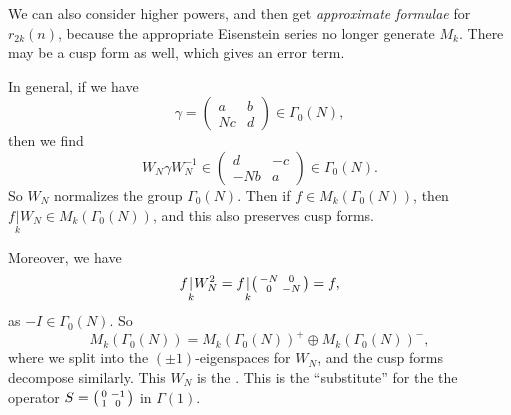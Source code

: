 \documentclass[a4paper]{article}
\begin{document}
We can also consider higher powers, and then get \emph{approximate formulae} for $r_{2k}(n)$, because the appropriate Eisenstein series no longer generate $M_k$. There may be a cusp form as well, which gives an error term.

In general, if we have
\[
  \gamma =
  \begin{pmatrix}
    a & b\\
    Nc & d
  \end{pmatrix} \in \Gamma_0(N),
\]
then we find
\[
  W_N \gamma W_N^{-1} \in
  \begin{pmatrix}
    d & -c\\
    -Nb & a
  \end{pmatrix} \in \Gamma_0(N).
\]
So $W_N$ normalizes the group $\Gamma_0(N)$. Then if $f \in M_k(\Gamma_0(N))$, then $f \underset{k}{|} W_N \in M_k(\Gamma_0(N))$, and this also preserves cusp forms.

Moreover, we have
\[
  f \underset{k}{|} W_N^2 = f \underset{k}{|}
  \begin{psmallmatrix}
    -N & 0\\
    0 & -N
  \end{psmallmatrix} = f,
\]
as $-I \in \Gamma_0(N)$. So
\[
  M_k(\Gamma_0(N)) = M_k(\Gamma_0(N))^+ \oplus M_k(\Gamma_0(N))^-,
\]
where we split into the $(\pm 1)$-eigenspaces for $W_N$, and the cusp forms decompose similarly. This $W_N$ is the . This is the ``substitute'' for the the operator $S = \begin{psmallmatrix} 0 & -1\\ 1 & 0\end{psmallmatrix}$ in $\Gamma(1)$.
\end{document}
